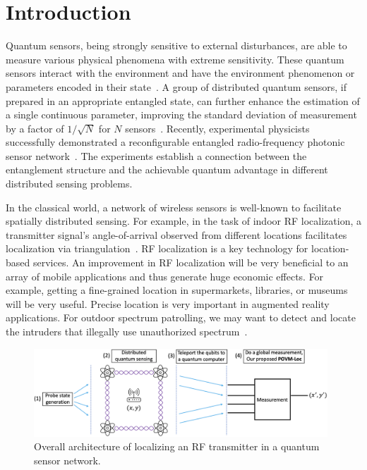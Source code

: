 \section{Introduction}



Quantum sensors, being strongly sensitive to external disturbances, are able to measure various physical phenomena with extreme sensitivity.
These quantum sensors interact with the environment and have the environment phenomenon or parameters encoded in their state~\cite{RevModPhys.quantumsensing}.
A group of distributed quantum sensors, if prepared in an appropriate entangled state, can further enhance the estimation of a single continuous parameter, improving the standard deviation of measurement by a factor of $1/\sqrt{N}$ for $N$ sensors~\cite{Giovannetti_2011}.
Recently, experimental physicists successfully demonstrated a reconfigurable entangled radio-frequency photonic sensor network~\cite{PRL20-qsn,arizona21-thesis}.
The experiments establish a connection between the entanglement structure and the achievable quantum advantage in different distributed sensing problems.

In the classical world, a network of wireless sensors is well-known to facilitate spatially distributed sensing.
For example, in the task of indoor RF localization, a transmitter signal's angle-of-arrival observed from different locations facilitates localization via triangulation~\cite{nsdi13-arraytrack}.
RF localization is a key technology for location-based services.
An improvement in RF localization will be very beneficial to an array of mobile applications and thus generate huge economic effects.
For example, getting a fine-grained location in supermarkets, libraries, or museums will be very useful.
Precise location is very important in augmented reality applications.
For outdoor spectrum patrolling, we may want to detect and locate the intruders that illegally use unauthorized spectrum~\cite{infocom18-spectrum}.



\begin{figure}[t]
    \centering
    \includegraphics[width=0.98\textwidth]{chapters/icc/figures/overall.png}
    \caption{Overall architecture of localizing an RF transmitter in a quantum sensor network.}
    \label{fig:quantumoverall}
\end{figure}


